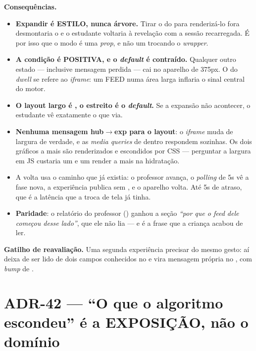 \textbf{Consequências.}
\begin{itemize}
  \item \textbf{Expandir é ESTILO, nunca árvore.} Tirar o  do
     para renderizá-lo fora desmontaria o  e
    o estudante voltaria à revelação com a sessão recarregada. É por isso que o
    modo é uma \emph{prop}, e não um  trocando o \emph{wrapper}.
  \item \textbf{A condição é POSITIVA, e o \emph{default} é contraído.}
    Qualquer outro estado --- inclusive mensagem perdida --- cai no aparelho de
    375px. O  do \emph{dwell} se refere ao
    \emph{iframe}: um FEED numa área larga inflaria o sinal central do motor.
  \item \textbf{O layout largo é , o estreito é o \emph{default}.} Se a
    expansão não acontecer, o estudante vê exatamente o que via.
  \item \textbf{Nenhuma mensagem hub$\rightarrow$exp para o layout}: o
    \emph{iframe} muda de largura de verdade, e as \emph{media queries} de
    dentro respondem sozinhas. Os dois gráficos a mais são renderizados e
    escondidos por CSS --- perguntar a largura em JS custaria um
     e um render a mais na hidratação.
  \item A volta usa o caminho que já existia: o professor avança, o
    \emph{polling} de 5s vê a fase nova, a experiência publica
     sem , e o aparelho volta. Até 5s de
    atraso, que é a latência que a troca de tela já tinha.
  \item \textbf{Paridade}: o relatório do professor ()
    ganhou a seção \emph{``por que o feed dele começou desse lado''}, que ele
    não lia --- e é a frase que a criança acabou de ler.
\end{itemize}

\textbf{Gatilho de reavaliação.} Uma segunda experiência precisar do mesmo
gesto: aí  deixa de ser lido de dois campos conhecidos no
 e vira mensagem própria no , com \emph{bump}
de .


\section{ADR-42 --- ``O que o algoritmo escondeu'' é a EXPOSIÇÃO, não o domínio}
\label{adr:exposicao}

